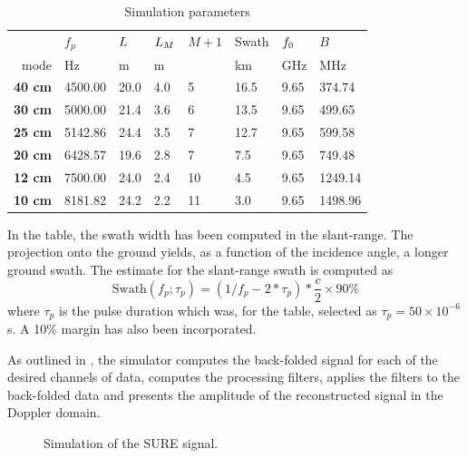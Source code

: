 \begin{table}[ht!]
\begin{center}
 \caption{Simulation parameters}
 \label{tb:simulation}
 \begin{tabular}{r|l|l|l|l|l|l|l}
  {} & {\bf $f_p$} & {\bf $L$} & {\bf $L_M$} & {\bf $M+1$} & {Swath} & {\bf $f_0$} & {\bf $B$}\\
 {mode}      & {Hz}    & m    & m   &   & km   & GHz  & MHz\\\hline
 {\bf 40 cm} & 4500.00 & 20.0 & 4.0 & 5 & 16.5 & 9.65 & 374.74\\\hline
 {\bf 30 cm} & 5000.00 & 21.4 & 3.6 & 6 & 13.5 & 9.65 & 499.65\\\hline
 {\bf 25 cm} & 5142.86 & 24.4 & 3.5 & 7 & 12.7 & 9.65 & 599.58\\\hline
 {\bf 20 cm} & 6428.57 & 19.6 & 2.8 & 7 & 7.5  & 9.65 & 749.48\\\hline
 {\bf 12 cm} & 7500.00 & 24.0 & 2.4 & 10 & 4.5 & 9.65 & 1249.14\\\hline
 {\bf 10 cm} & 8181.82 & 24.2 & 2.2 & 11 & 3.0 & 9.65 & 1498.96\\\hline
 \end{tabular}
 \end{center}
\end{table}
In the table, the swath width has been computed in the slant-range. The projection onto the ground yields, as a function of the incidence angle, a longer ground swath. The estimate for the slant-range swath is computed as
\begin{equation}
 \text{Swath}(f_p; \tau_p) = \left(1/f_p - 2*\tau_p\right)*\frac{c}{2}\times 90\%
\end{equation}
where $\tau_p$ is the pulse duration which was, for the table, selected as $\tau_p=50\times10^{-6}$ s. A 10\% margin has also been incorporated.
\par
As outlined in , the simulator computes the back-folded signal for each of the desired channels of data, computes the processing filters, applies the filters to the back-folded data and presents the amplitude of the reconstructed signal in the Doppler domain.
\begin{figure}[ht!]
\begin{center}
 \caption{Simulation of the SURE signal.}
 \label{fg:simflow}
 \end{center}
\end{figure}
